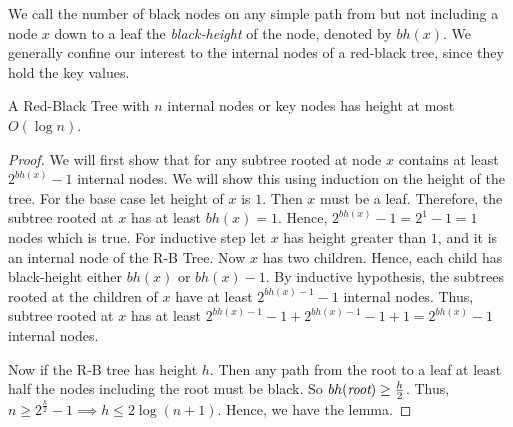 We call the number of black nodes on any simple path from  but not including a node $x$ down to a leaf the \emph{black-height} of the node, denoted by $bh(x)$. We generally confine our interest to the internal nodes of a red-black tree, since they hold the key values.
\begin{Lemma}{}{}
	A Red-Black Tree with $n$ internal nodes or key nodes has height at most $O(\log n)$.
\end{Lemma}
\begin{proof}
	We will first show that for any subtree rooted at node $x$ contains at least $2^{bh(x)}-1$ internal nodes. We will show this using induction on the height of the tree. For the base case let height of $x$ is $1$. Then $x$ must be a leaf. Therefore, the subtree rooted at $x$ has at least $bh(x)=1$. Hence, $2^{bh(x)}-1=2^1-1=1$  nodes which is true. For inductive step let $x$ has height greater than $1$, and it is an internal node of the R-B Tree. Now $x$ has two children. Hence, each child has black-height either $bh(x)$ or $bh(x)-1$. By inductive hypothesis, the subtrees rooted at the children of $x$ have at least $2^{bh(x)-1}-1$ internal nodes. Thus, subtree rooted at $x$ has at least $2^{bh(x)-1}-1+2^{bh(x)-1}-1+1=2^{bh(x)}-1$ internal nodes.

	Now if the R-B tree has height $h$. Then any path from the root to a leaf at least half the nodes including the root must be black. So $bh(\emph{root})\geq \frac{h}2$. Thus, $n\geq 2^{\frac{h}2}-1\implies h\leq 2\log(n+1)$. Hence, we have the lemma.
\end{proof}


